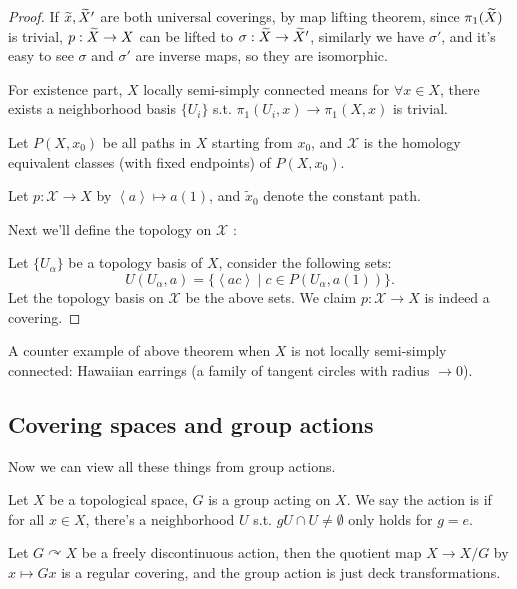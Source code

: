 \begin{proof}[Proof]
    If $\widetilde{x}, \widetilde{X}'$ are both universal coverings,
	by map lifting theorem, since $\pi_1(\widetilde{X})$ is trivial,
	$p: \widetilde{X} \to X$ can be lifted to $\sigma: \widetilde{X}\to \widetilde{X}'$,
	similarly we have $\sigma'$, and it's easy to see $\sigma$ and
	$\sigma'$ are inverse maps, so they are isomorphic.

	For existence part, $X$ locally semi-simply connected means
	for $\forall x\in X$, there exists a neighborhood basis $\{U_i\}$ s.t.
	$\pi_1(U_i, x) \to \pi_1(X, x)$ is trivial.

	Let $P(X, x_0)$ be all paths in $X$ starting from $x_0$,
	and $\mathscr{X}$ is the homology equivalent classes
	(with fixed endpoints) of $P(X, x_0)$.

	Let $p: \mathscr{X}\to X$ by $\left<a \right>\mapsto a(1)$,
	and $\tilde x_0$ denote the constant path.

	Next we'll define the topology on $\mathscr{X}$ :

	Let $\{U_\alpha\}$ be a topology basis of $X$,
	consider the following sets:
	\[
	U(U_\alpha, a) = \{\left<ac \right>\mid c\in P(U_\alpha, a(1))\}.
	\]
	Let the topology basis on $\mathscr{X}$ be the above sets.
	We claim $p: \mathscr{X}\to X$ is indeed a covering.
\end{proof}

\begin{example}
    A counter example of above theorem when $X$ is not locally
	semi-simply connected:
	Hawaiian earrings (a family of tangent circles with radius $\to 0$).
\end{example}

\subsection{Covering spaces and group actions}
\label{sub:Covering spaces and group actions}

Now we can view all these things from group actions.

Let $X$ be a topological space, $G$ is a group acting on $X$.
We say the action is  if
for all $x\in X$, there's a neighborhood $U$ s.t. $gU \cap U \ne \emptyset$ only
holds for $g = e$.

\begin{proposition}
	Let $G\curvearrowright X$ be a freely discontinuous action,
	then the quotient map $X \to X / G$ by $x\mapsto Gx$ is
	a regular covering, and the group action is just deck transformations.
\end{proposition}

